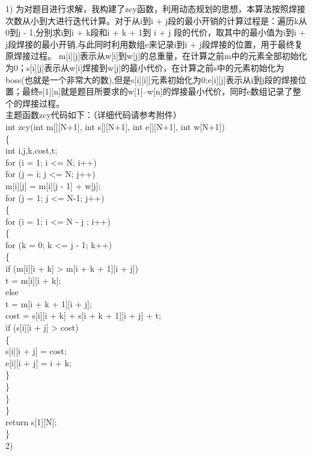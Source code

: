 \documentclass[UTF8]{ctexart}
\begin{document}
1)
为对题目进行求解，我构建了zcy函数，利用动态规划的思想，本算法按照焊接次数从小到大进行迭代计算。对于从i到i + j段的最小开销的计算过程是：遍历k从0到j - 1,分别求i到i + k段和i + k + 1到 i + j 段的代价，取其中的最小值为i到i + j段焊接的最小开销,与此同时利用数组e来记录i到i + j段焊接的位置，用于最终复原焊接过程。
m[i][j]表示从w[i]到w[j]的总重量，在计算之前m中的元素全部初始化为0；s[i][j]表示从w[i]焊接到w[j]的最小代价，在计算之前s中的元素初始化为boss(也就是一个非常大的数),但是s[i][i]]元素初始化为0;e[i][j]表示从i到j段的焊接位置；最终s[1][n]就是题目所要求的w[1]--w[n]的焊接最小代价，同时e数组记录了整个的焊接过程。\\
主题函数zcy代码如下：（详细代码请参考附件）\\
int zcy(int m[][N+1], int s[][N+1], int e[][N+1], int w[N+1])\\
\{\\
	int i,j,k,cost,t;\\
	for (i = 1; i <= N; i++)\\
		for (j = i; j <= N; j++)\\
			m[i][j] = m[i][j - 1] + w[j];\\
	for (j = 1; j <= N-1; j++)\\
	\{\\
		for (i = 1; i <= N - j ; i++)\\
		\{\\
			for (k = 0; k <= j - 1; k++)\\
			\{\\
				if (m[i][i + k] > m[i + k + 1][i + j])\\
					t = m[i][i + k];\\
				else\\
					t = m[i + k + 1][i + j];\\
				cost = s[i][i + k] + s[i + k + 1][i + j] + t;\\
				if (s[i][i + j] > cost)\\
				\{\\
					s[i][i + j] = cost;\\
					e[i][i + j] = i + k;\\
				\}\\
			\}\\
		\}\\
	\}\\
	return s[1][N];\\
\}\\
2)
\end{document}
